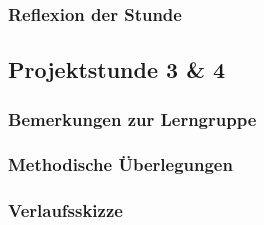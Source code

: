 \noindent{}\newpage
\subsubsection{Reflexion der Stunde}
\newpage
\subsection{Projektstunde 3 \& 4}\ellen
\subsubsection{Bemerkungen zur Lerngruppe}
\subsubsection{Methodische Überlegungen}
\subsubsection{Verlaufsskizze}

